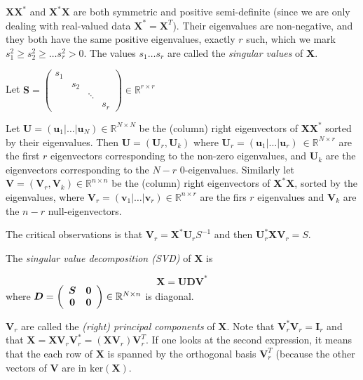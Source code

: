 \documentclass[11pt, a4paper]{report}
\theoremstyle{plain}
\theoremstyle{definition}
\theoremstyle{remark}
\newcommand{\R}{\mathbb{R}}
\newcommand{\X}{\mathbf{X}}
\newcommand{\bv}[1]{\boldsymbol{#1}}
\newcommand{\gt}{>}
\begin{document}
$\X \X^*$ and $\X^* \X$ are both symmetric and positive semi-definite
(since we are only dealing with real-valued data $\X^* = \X^T$). Their
eigenvalues are non-negative, and they both have the same positive eigenvalues,
exactly $r$ such, which we mark $s_1^2 \geq s_2^2 \geq \dots s_r^2 \gt 0$. The
values $s_1 \dots s_r$ are called the \emph{singular values} of $\bv{X}$.

Let $\bv{S} = 
\begin{pmatrix}
s_1 & & &\\
& s_2 & &\\
& & \ddots &\\
& & & s_r
\end{pmatrix} \in \R^{r \times r}
$

Let $\bv{U} = (\bv{u}_1 | \dots | \bv{u}_N) \in \R^{N \times N}$ be the (column)
right eigenvectors of $\X \X^*$ sorted by their eigenvalues. Then $\bv{U} =
(\bv{U}_r, \bv{U}_k)$ where $\bv{U}_r = (\bv{u}_1 | \dots | \bv{u}_r) \ \in
\R^{N \times r}$ are the first $r$ eigenvectors corresponding to the non-zero
eigenvalues, and $\bv{U}_k$ are the eigenvectors corresponding to the $N-r$
$0$-eigenvalues. Similarly let $\bv{V}  = (\bv{V}_r, \bv{V}_k)\in \R^{n \times
n}$ be the (column) right eigenvectors of $\X^* \X$, sorted by the eigenvalues,
where $\bv{V}_r  = (\bv{v}_1 | \dots | \bv{v}_r) \in \R^{n \times r}$ are the
firs $r$ eigenvalues and $\bv{V}_k$ are the $n-r$ null-eigenvectors.

The critical observations is that $\bv{V}_r = \bv{X}^* \bv{U}_r S^{-1}$ and then
$\bv{U}_r^* \X \bv{V}_r = S$.

The \textit{singular value decomposition (SVD)} of $\X$ is 

\begin{equation}
\label{eq:svd}
\X = \bv{U} \bv{D} \bv{V}^*
\end{equation}
where 
$\bv{D} =
\left(
\begin{array}{c c}
\bv{S} & \bv{0} \\
\bv{0} & \bv{0}
\end{array}
\right) \in \R^{N \times n}
$ is diagonal.

$\bv{V}_r$ are called the \textit{(right) principal components} of $\X$.
Note that $\bv{V}_r^* \bv{V}_r = \bv{I}_r$ and that 
$\X = \X \bv{V}_r \bv{V}_r^* = (\X \bv{V}_r) \bv{V}_r^T$. If one looks at the second expression, 
it means that the each row of $\X$ is spanned by the orthogonal
basis $\bv{V}_r^T$ (because the other vectors of $\bv{V}$ are in $\text{ker}(\X)$.
\end{document}

